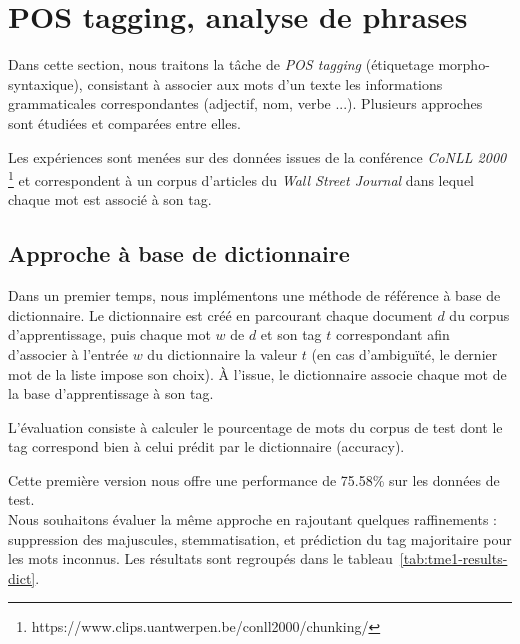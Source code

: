 \documentclass[a4paper]{article}
\newcommand{\tabref}[1]{tableau~\ref{#1}}
\begin{document}
\section{POS tagging, analyse de phrases}

Dans cette section, nous traitons la tâche de \emph{POS tagging} (étiquetage
morpho-syntaxique), consistant à associer aux mots d'un texte les informations
grammaticales correspondantes (adjectif, nom, verbe ...). Plusieurs approches
sont étudiées et comparées entre elles.

Les expériences sont menées sur des données issues de la conférence \emph{CoNLL
2000} \footnote{https://www.clips.uantwerpen.be/conll2000/chunking/} et
correspondent à un corpus d'articles du \emph{Wall Street Journal} dans lequel
chaque mot est associé à son tag. 


\subsection{Approche à base de dictionnaire}

Dans un premier temps, nous implémentons une méthode de référence à base de
dictionnaire. Le dictionnaire est créé en parcourant chaque document $d$ du
corpus d'apprentissage, puis chaque mot $w$ de $d$ et son tag $t$ correspondant
afin d'associer à l'entrée $w$ du dictionnaire la valeur $t$ (en cas
d'ambiguïté, le dernier mot de la liste impose son choix). À l'issue, le
dictionnaire associe chaque mot de la base d'apprentissage à son tag.

L'évaluation consiste à calculer le pourcentage de mots du corpus de test dont
le tag correspond bien à celui prédit par le dictionnaire (accuracy). 

Cette première version nous offre une performance de 75.58\% sur les données de
test. \\

Nous souhaitons évaluer la même approche en rajoutant quelques raffinements :
suppression des majuscules, stemmatisation, et prédiction du tag majoritaire pour les mots
inconnus. Les résultats sont regroupés dans le \tabref{tab:tme1-results-dict}.

\begin{table}[H]
\centering
{}
\caption{Résultats en termes d'accuracy pour différentes variantes de l'approche
    à base de dictionnaire}
\label{tab:tme1-results-dict}
\end{table}
\end{document}
